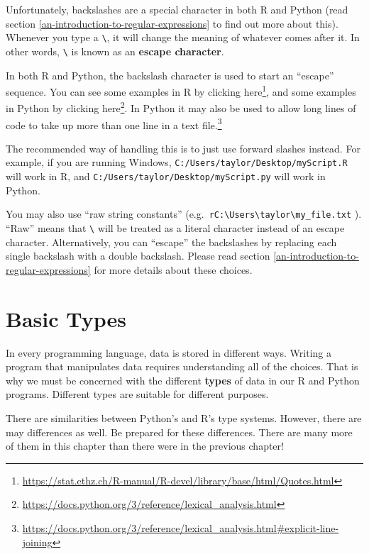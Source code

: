 \documentclass[
  12pt,
  krantz2]{krantz}
\renewcommand{\href}[2]{#2\footnote{\url{#1}}}
\newenvironment{rmd-details}{\begin{lrbox}{\rmdbox}
  \minipage[c]{\dimexpr \textwidth-2\fboxrule-\wd\bulb-\columnsep}
    \vspace*{\columnsep}}%
{\vspace*{\columnsep}\endminipage\end{lrbox}%
  {\par\color{green}\fboxsep=0pt
    \fbox{\usebox\bulb\usebox\rmdbox\hspace{\columnsep}}\par}}
\begin{document}
Unfortunately, backslashes are a special character in both R and Python (read section \ref{an-introduction-to-regular-expressions} to find out more about this). Whenever you type a \texttt{\textbackslash{}}, it will change the meaning of whatever comes after it. In other words, \texttt{\textbackslash{}} is known as an \textbf{escape character}.

\begin{rmd-details}
In both R and Python, the backslash character is used to start an ``escape'' sequence. You can see some examples in R by clicking \href{https://stat.ethz.ch/R-manual/R-devel/library/base/html/Quotes.html}{here}, and some examples in Python by clicking \href{https://docs.python.org/3/reference/lexical_analysis.html}{here}. In Python it may also be used to \href{https://docs.python.org/3/reference/lexical_analysis.html\#explicit-line-joining}{allow long lines of code to take up more than one line in a text file.}

\end{rmd-details}

The recommended way of handling this is to just use forward slashes instead. For example, if you are running Windows, \texttt{C:/Users/taylor/Desktop/myScript.R} will work in R, and \texttt{C:/Users/taylor/Desktop/myScript.py} will work in Python.

You may also use ``raw string constants'' (e.g.~\texttt{r\textquotesingle{}C:\textbackslash{}Users\textbackslash{}taylor\textbackslash{}my\_file.txt\textquotesingle{}} ). ``Raw'' means that \texttt{\textbackslash{}} will be treated as a literal character instead of an escape character. Alternatively, you can ``escape'' the backslashes by replacing each single backslash with a double backslash. Please read section \ref{an-introduction-to-regular-expressions} for more details about these choices.

\hypertarget{basic-types}{%
\chapter{Basic Types}\label{basic-types}}

In every programming language, data is stored in different ways. Writing a program that manipulates data requires understanding all of the choices. That is why we must be concerned with the different \textbf{types} of data in our R and Python programs. Different types are suitable for different purposes.

There are similarities between Python's and R's type systems. However, there are may differences as well. Be prepared for these differences. There are many more of them in this chapter than there were in the previous chapter!
\end{document}
